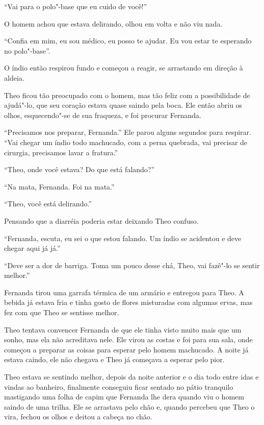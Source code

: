 ``Vai para o polo"-base que eu cuido de você!''

O homem achou que estava delirando, olhou em volta e não viu nada.

``Confia em mim, eu sou médico, eu posso te ajudar. Eu vou estar te
esperando no polo"-base''.

O índio então respirou fundo e começou a reagir, se arrastando em
direção à aldeia.

Theo ficou tão preocupado com o homem, mas tão feliz com a possibilidade
de ajudá"-lo, que seu coração estava quase saindo pela boca. Ele então
abriu os olhos, esquecendo"-se de sua fraqueza, e foi procurar Fernanda.

``Precisamos nos preparar, Fernanda.'' Ele parou alguns segundos para
respirar. ``Vai chegar um índio todo machucado, com a perna quebrada,
vai precisar de cirurgia, precisamos lavar a fratura.''

``Theo, onde você estava? Do que está falando?''

``Na mata, Fernanda. Foi na mata.''

``Theo, você está delirando.''

Pensando que a diarréia poderia estar deixando Theo confuso.

``Fernanda, escuta, eu sei o que estou falando. Um índio se acidentou e
deve chegar aqui já já.''

``Deve ser a dor de barriga. Toma um pouco desse chá, Theo, vai fazê"-lo
se sentir melhor.''

Fernanda tirou uma garrafa térmica de um armário e entregou para Theo. A
bebida já estava fria e tinha gosto de flores misturadas com algumas
ervas, mas fez com que Theo se sentisse melhor.

Theo tentava convencer Fernanda de que ele tinha visto muito mais que um
sonho, mas ela não acreditava nele. Ele virou as costas e foi para sua
sala, onde começou a preparar as coisas para esperar pelo homem
machucado. A noite já estava caindo, ele não chegava e Theo já começava
a esperar pelo pior.

\asterisc


Theo estava se sentindo melhor, depois da noite anterior e o dia todo
entre idas e vindas ao banheiro, finalmente conseguiu ficar sentado no
pátio tranquilo mastigando uma folha de capim que Fernanda lhe dera
quando viu o homem saindo de uma trilha. Ele se arrastava pelo chão e,
quando percebeu que Theo o vira, fechou os olhos e deitou a cabeça no
chão.

